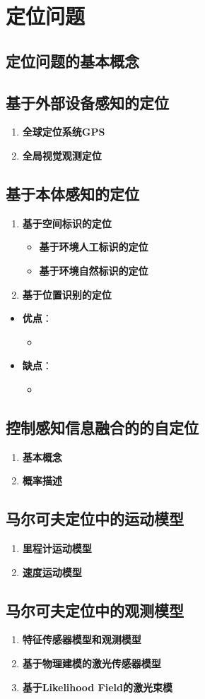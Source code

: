 \documentclass[../main.tex]{subfiles}
\begin{document}
\section{定位问题}
\subsection{定位问题的基本概念}
\subsection{基于外部设备感知的定位}
\begin{enumerate}
    \item \textbf{全球定位系统GPS}
    \item \textbf{全局视觉观测定位}
\end{enumerate}
\subsection{基于本体感知的定位}
\begin{enumerate}
    \item \textbf{基于空间标识的定位}
        \begin{itemize}
            \item \textbf{基于环境人工标识的定位}
            \item \textbf{基于环境自然标识的定位}
        \end{itemize}
    \item \textbf{基于位置识别的定位}
\end{enumerate}
\begin{itemize}
    \item \textbf{优点}：
        \begin{itemize}
            \item 
        \end{itemize}
    \item \textbf{缺点}：
        \begin{itemize}
            \item 
        \end{itemize}
\end{itemize}
\subsection{控制感知信息融合的的自定位}
\begin{enumerate}
    \item \textbf{基本概念}
    \item \textbf{概率描述}
\end{enumerate}
\subsection{马尔可夫定位中的运动模型}
\begin{enumerate}
    \item \textbf{里程计运动模型}
    \item \textbf{速度运动模型}
\end{enumerate}
\subsection{马尔可夫定位中的观测模型}
\begin{enumerate}
    \item \textbf{特征传感器模型和观测模型}
    \item \textbf{基于物理建模的激光传感器模型}
    \item \textbf{基于Likelihood Field的激光束模}
\end{enumerate}
\end{document}
